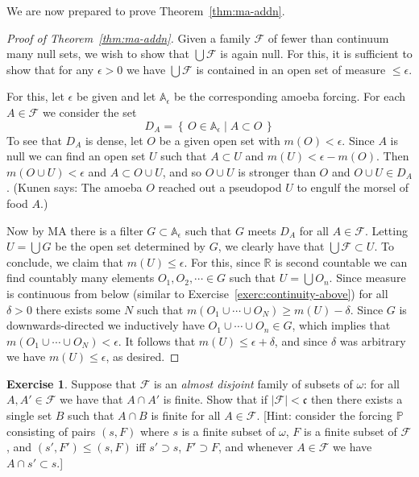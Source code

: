 \documentclass[11pt,oneside]{amsbook}
\newcommand{\set}[1]{\left\{\,#1\,\right\}}
\newcommand{\PP}{\mathbb P}
\theoremstyle{definition}
\newtheorem{exerc}{Exercise}[section]
\theoremstyle{plain}
\theoremstyle{definition}
\theoremstyle{remark}
\begin{document}
We are now prepared to prove Theorem~\ref{thm:ma-addn}.

\begin{proof}[Proof of Theorem~\ref{thm:ma-addn}]
  Given a family $\mathcal F$ of fewer than continuum many null sets, we wish to show that $\bigcup\mathcal F$ is again null. For this, it is sufficient to show that for any $\epsilon>0$ we have $\bigcup\mathcal F$ is contained in an open set of measure $\leq\epsilon$.

  For this, let $\epsilon$ be given and let $\mathbb A_\epsilon$ be the corresponding amoeba forcing. For each $A\in\mathcal F$ we consider the set
  \[D_A=\set{O\in\mathbb A_\epsilon\mid A\subset O}
  \]
  To see that $D_A$ is dense, let $O$ be a given open set with $m(O)<\epsilon$. Since $A$ is null we can find an open set $U$ such that $A\subset U$ and $m(U)<\epsilon-m(O)$. Then $m(O\cup U)<\epsilon$ and $A\subset O\cup U$, and so $O\cup U$ is stronger than $O$ and $O\cup U\in D_A$. (Kunen says: The amoeba $O$ reached out a pseudopod $U$ to engulf the morsel of food $A$.)

  Now by MA there is a filter $G\subset\mathbb A_\epsilon$ such that $G$ meets $D_A$ for all $A\in\mathcal F$. Letting $U=\bigcup G$ be the open set determined by $G$, we clearly have that $\bigcup\mathcal F\subset U$. To conclude, we claim that $m(U)\leq\epsilon$. For this, since $\mathbb R$ is second countable we can find countably many elements $O_1,O_2,\cdots\in G$ such that $U=\bigcup O_n$. Since measure is continuous from below (similar to Exercise~\ref{exerc:continuity-above}) for all $\delta>0$ there exists some $N$ such that $m(O_1\cup\cdots\cup O_N)\geq m(U)-\delta$. Since $G$ is downwards-directed we inductively have $O_1\cup\cdots\cup O_n\in G$, which implies that $m(O_1\cup\cdots\cup O_N)<\epsilon$. It follows that $m(U)\leq\epsilon+\delta$, and since $\delta$ was arbitrary we have $m(U)\leq\epsilon$, as desired.
\end{proof}

\begin{exerc}
  Suppose that $\mathcal F$ is an \emph{almost disjoint} family of subsets of $\omega$: for all $A,A'\in\mathcal F$ we have that $A\cap A'$ is finite. Show that if $|\mathcal F|<\mathfrak c$ then there exists a single set $B$ such that $A\cap B$ is finite for all $A\in\mathcal F$. [Hint: consider the forcing $\PP$ consisting of pairs $(s,F)$ where $s$ is a finite subset of $\omega$, $F$ is a finite subset of $\mathcal F$, and $(s',F')\leq(s,F)$ iff $s'\supset s$, $F'\supset F$, and whenever $A\in\mathcal F$ we have $A\cap s'\subset s$.]
\end{exerc}
\end{document}
